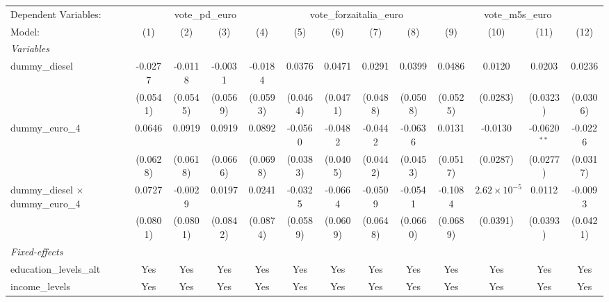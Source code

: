 
\begingroup
\centering
\begin{tabular}{lcccccccccccc}
   \tabularnewline \midrule \midrule
   Dependent Variables: & \multicolumn{4}{c}{vote\_pd\_euro} & \multicolumn{4}{c}{vote\_forzaitalia\_euro} & \multicolumn{4}{c}{vote\_m5s\_euro}\\
   Model:                                    & (1)      & (2)      & (3)      & (4)      & (5)      & (6)      & (7)      & (8)      & (9)      & (10)                  & (11)           & (12)\\  
   \midrule
   \emph{Variables}\\
   dummy\_diesel                             & -0.0277  & -0.0118  & -0.0031  & -0.0184  & 0.0376   & 0.0471   & 0.0291   & 0.0399   & 0.0486   & 0.0120                & 0.0203         & 0.0236\\   
                                             & (0.0541) & (0.0545) & (0.0569) & (0.0593) & (0.0464) & (0.0471) & (0.0488) & (0.0508) & (0.0525) & (0.0283)              & (0.0323)       & (0.0306)\\   
   dummy\_euro\_4                            & 0.0646   & 0.0919   & 0.0919   & 0.0892   & -0.0560  & -0.0482  & -0.0442  & -0.0636  & 0.0131   & -0.0130               & -0.0620$^{**}$ & -0.0226\\   
                                             & (0.0628) & (0.0618) & (0.0666) & (0.0698) & (0.0383) & (0.0405) & (0.0442) & (0.0453) & (0.0517) & (0.0287)              & (0.0277)       & (0.0317)\\   
   dummy\_diesel $\times$ dummy\_euro\_4     & 0.0727   & -0.0029  & 0.0197   & 0.0241   & -0.0325  & -0.0664  & -0.0509  & -0.0541  & -0.1084  & $2.62\times 10^{-5}$  & 0.0112         & -0.0093\\   
                                             & (0.0801) & (0.0801) & (0.0842) & (0.0874) & (0.0589) & (0.0609) & (0.0648) & (0.0660) & (0.0689) & (0.0391)              & (0.0393)       & (0.0421)\\   
   \midrule
   \emph{Fixed-effects}\\
   education\_levels\_alt                    & Yes      & Yes      & Yes      & Yes      & Yes      & Yes      & Yes      & Yes      & Yes      & Yes                   & Yes            & Yes\\  
   income\_levels                            & Yes      & Yes      & Yes      & Yes      & Yes      & Yes      & Yes      & Yes      & Yes      & Yes                   & Yes            & Yes\\  

\end{tabular}

